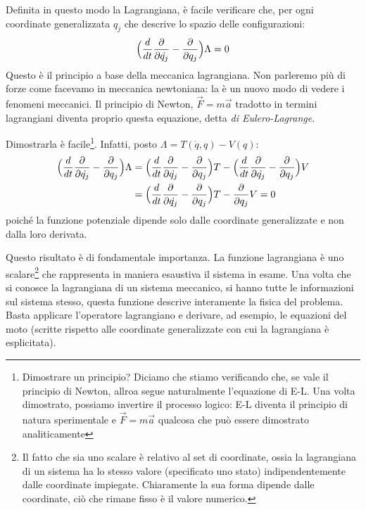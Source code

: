 \documentclass[a4paper,openany]{article}
\begin{document}
	Definita in questo modo la Lagrangiana, è facile verificare che, per ogni coordinate generalizzata $q_j$ che descrive lo spazio delle configurazioni:
	\begin{equation}
		\Bigl(\frac{d}{dt}\dfrac{\partial}{\partial \dot{q_{j}}} - \dfrac{\partial}{\partial q_{j}}\Bigl)\Lambda = 0
	\end{equation}
	Questo è il principio a base della meccanica lagrangiana. Non parleremo più di forze come facevamo in meccanica newtoniana: la  è un nuovo modo di vedere i fenomeni meccanici. Il principio di Newton, $\vec{F} = m\vec{a}$ tradotto in termini lagrangiani diventa proprio questa equazione, detta \textit{di Eulero-Lagrange}.
	
	Dimostrarla è facile\footnote{Dimostrare un principio? Diciamo che stiamo verificando che, se vale il principio di Newton, allroa segue naturalmente l'equazione di E-L. Una volta dimostrato, possiamo invertire il processo logico: E-L diventa il principio di natura sperimentale e $\vec{F} = m\vec{a}$ qualcosa che può essere dimostrato analiticamente}. Infatti, posto $\Lambda = T(\dot{q},q)-V(q)$:
	\begin{align}
		\Bigl(\frac{d}{dt}\dfrac{\partial}{\partial \dot{q_{j}}} - \dfrac{\partial}{\partial q_{j}}\Bigl)\Lambda &= 	\Bigl(\frac{d}{dt}\dfrac{\partial}{\partial \dot{q_{j}}} - \dfrac{\partial}{\partial q_{j}}\Bigl)T - 	\Bigl(\frac{d}{dt}\dfrac{\partial}{\partial \dot{q_{j}}} - \dfrac{\partial}{\partial q_{j}}\Bigl)V \\
		&= 	\Bigl(\frac{d}{dt}\dfrac{\partial}{\partial \dot{q_{j}}} - \dfrac{\partial}{\partial q_{j}}\Bigl)T - \dfrac{\partial}{\partial q_{j}}V = 0
	\end{align}
	poiché la funzione potenziale dipende solo dalle coordinate generalizzate e non dalla loro derivata. 
	
	Questo risultato è di fondamentale importanza. La funzione lagrangiana è uno scalare\footnote{Il fatto che sia uno scalare è relativo al set di coordinate, ossia la lagrangiana di un sistema ha lo stesso valore (specificato uno stato) indipendentemente dalle coordinate impiegate. Chiaramente la sua forma dipende dalle coordinate, ciò che rimane fisso è il valore numerico.} che rappresenta in maniera esaustiva il sistema in esame. Una volta che si conosce la lagrangiana di un sistema meccanico, si hanno tutte le informazioni sul sistema stesso, questa funzione descrive interamente la fisica del problema. Basta applicare l'operatore lagrangiano e derivare, ad esempio, le equazioni del moto (scritte rispetto alle coordinate generalizzate con cui la lagrangiana è esplicitata).
\end{document}
